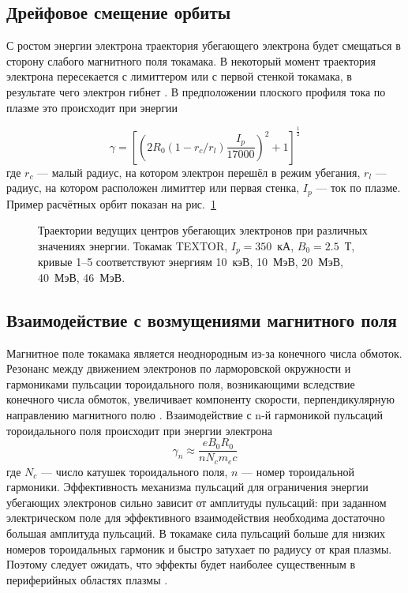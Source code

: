 
\subsection{Дрейфовое смещение орбиты}

С ростом энергии электрона траектория убегающего электрона будет смещаться в сторону слабого магнитного поля токамака. В некоторый момент траектория электрона пересекается с лимиттером или с первой стенкой токамака, в результате чего электрон гибнет \cite{MartinSolis1999,Carbajal2017}. В предположении плоского профиля тока по плазме это происходит при энергии \cite{Knoepfel1979,MartinSolis1999}

\begin{equation*}
  \gamma = \left[ \left( 2 R_0 ( 1 - r_c / r_l ) \frac{I_p}{17000} \right)^2 + 1 \right]^{\frac{1}{2}}
\end{equation*}
где $r_c$ --- малый радиус, на котором электрон перешёл в режим убегания, $r_l$ --- радиус, на котором расположен лимиттер или первая стенка, $I_p$ --- ток по плазме. Пример расчётных орбит показан на рис.~\ref{fig:breizmanOrbits}

\begin{figure}[ht]
  \caption{ Траектории ведущих центров убегающих электронов при различных значениях энергии. Токамак TEXTOR, $I_p = 350$~кА, $B_0 = 2.5$~Т, кривые 1--5 соответствуют энергиям 10~кэВ, 10~МэВ, 20~МэВ, 40~МэВ, 46~МэВ\cite{Breizman2019,Abdullaev2016}.}
  \label{fig:breizmanOrbits}
\end{figure}


\subsection{Взаимодействие с возмущениями магнитного поля}

Магнитное поле токамака является неоднородным из-за конечного числа обмоток. Резонанс между движением электронов по ларморовской окружности и гармониками пульсации тороидального поля, возникающими вследствие конечного числа обмоток, увеличивает компоненту скорости, перпендикулярную направлению магнитного полю \cite{MartinSolis1998,MartinSolis1999,Laurent1990}. Взаимодействие с n-й гармоникой пульсаций тороидального поля происходит при энергии электрона 
\begin{equation*}
  \gamma_n \approx \frac{ e B_0 R_0 }{ n N_c m_e c }
\end{equation*}
где $N_c$ --- число катушек тороидального поля, $n$ --- номер тороидальной гармоники. Эффективность механизма пульсаций для ограничения энергии убегающих электронов сильно зависит от амплитуды пульсаций: при заданном электрическом поле для эффективного взаимодействия необходима достаточно большая амплитуда пульсаций. В токамаке сила пульсаций больше для низких номеров тороидальных гармоник и быстро затухает по радиусу от края плазмы. Поэтому следует ожидать, что эффекты будет наиболее существенным в периферийных областях плазмы \cite{MartinSolis1998}.

